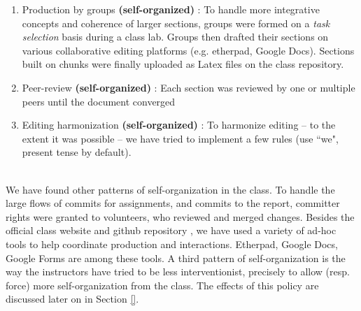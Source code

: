 \begin{enumerate}
  \item Production by groups {\bf (self-organized)} : To handle more integrative concepts and coherence of larger sections, groups were formed on a {\it task selection} basis during a class lab. Groups then drafted their sections on various collaborative editing platforms (e.g. etherpad, Google Docs). Sections built on chunks were finally uploaded as Latex files on the class repository.
  \item Peer-review {\bf (self-organized)} : Each section was reviewed by one or multiple peers until the document converged 
  \item Editing harmonization {\bf (self-organized)} : To harmonize editing -- to the extent it was possible -- we have tried to implement a few rules (use ``we", present tense by default).
\end{enumerate}




\\ 
We have found other patterns of self-organization in the class. To handle the large flows of commits for assignments, and commits to the report, committer rights were granted to volunteers, who reviewed and merged changes. Besides 
the official class website and github repository \cite{classweb2013}, we have used a variety of ad-hoc tools to help coordinate production and interactions. Etherpad, Google Docs, Google Forms are among these tools. A third pattern of self-organization is the way the instructors have tried to be less interventionist, precisely to allow (resp. force) more self-organization from the class. The effects of this policy are discussed later on in Section \ref{}.


